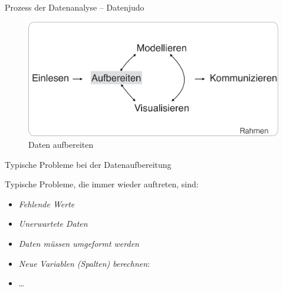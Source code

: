 \begin{frame}{Prozess der Datenanalyse -- Datenjudo}

\begin{figure}

{\centering \includegraphics[width=0.8\linewidth]{../images/Datenjudo/Aufbereiten} 

}

\caption{Daten aufbereiten}\label{fig:fig-datenjudo}
\end{figure}

\end{frame}

\begin{frame}{Typische Probleme bei der Datenaufbereitung}

Typische Probleme, die immer wieder auftreten, sind:

\begin{itemize}
\tightlist
\item
  \emph{Fehlende Werte}
\item
  \emph{Unerwartete Daten}
\item
  \emph{Daten müssen umgeformt werden}
\item
  \emph{Neue Variablen (Spalten) berechnen}:
\item
  \ldots{}
\end{itemize}

\end{frame}

